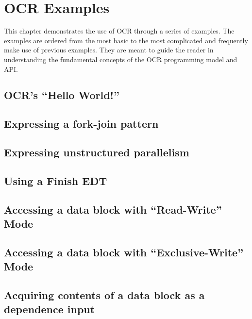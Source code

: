 

\chapter{OCR  Examples}
\label{chap:OCR Examples}
\label{chap:Appendix A}


This chapter demonstrates the use of OCR through a series of
examples. The examples are ordered from the most basic to the most
complicated and frequently make use of previous examples. They are
meant to guide the reader in understanding the fundamental concepts of
the OCR programming model and API.

\section{OCR's ``Hello World!''}

\section{Expressing a fork-join pattern}

\section{Expressing unstructured parallelism}

\section{Using a Finish EDT}

\section{Accessing a data block with ``Read-Write'' Mode}

\section{Accessing a data block with ``Exclusive-Write'' Mode}

\section{Acquiring contents of a data block as a dependence input}


